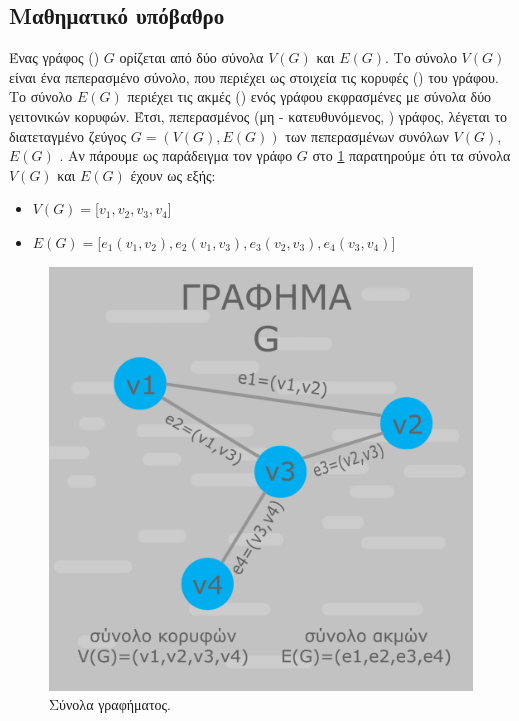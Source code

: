 \subsection{Μαθηματικό υπόβαθρο}
Ένας γράφος () $G$ ορίζεται από δύο σύνολα $V(G)$ και $E(G)$. Το σύνολο $V(G)$ είναι ένα πεπερασμένο σύνολο, που περιέχει ως στοιχεία τις κορυφές () του γράφου. Το σύνολο $E(G)$ περιέχει τις ακμές () ενός γράφου εκφρασμένες με σύνολα δύο γειτονικών κορυφών. Έτσι, πεπερασμένος (μη - κατευθυνόμενος, ) γράφος, λέγεται το διατεταγμένο ζεύγος $G = (V(G), E(G))$ των πεπερασμένων συνόλων $V(G)$, $E(G)$ \cite{ntenisiwtis2023thewria}. Αν πάρουμε ως παράδειγμα τον γράφο $G$ στο \ref{7} παρατηρούμε ότι τα σύνολα $V(G)$ και $E(G)$ έχουν ως εξής: 
\begin{itemize}
  \item $V(G)=$[$v_1,v_2,v_3,v_4$]
  \item $E(G)=$[$e_1(v_1,v_2),e_2(v_1,v_3),e_3(v_2,v_3),e_4(v_3,v_4)$] 
\end{itemize}

\begin{figure}
    \centering
    \includegraphics[scale=0.30]{2947_thesis/pictures/synola.png} 
    \caption{Σύνολα γραφήματος.}
    \label{7}
\end{figure}


